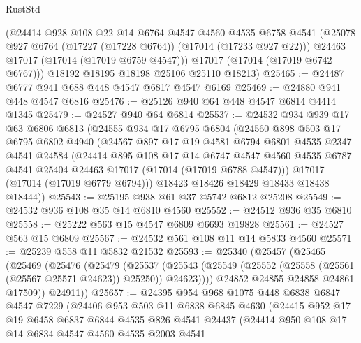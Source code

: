 \begin{lexlean}{RustStd}
\begin{coremodule}
        (@24414
          @928
          @108
          @22
          @14
          @6764
          @4547
          @4560
          @4535
          @6758
          @4541
          (@25078 @927 @6764 (@17227 (@17228 @6764)) (@17014 (@17233 @927 @22)))
          @24463
          @17017
          (@17014 (@17019 @6759 @4547)))
        @17017
        (@17014 (@17019 @6742 @6767)))
      @18192
      @18195
      @18198
      @25106
      @25110
      @18213)
@25465 := @24487 @6777 @941 @688 @448 @4547 @6817 @4547 @6169
@25469 := @24880 @941 @448 @4547 @6816
@25476 := @25126 @940 @64 @448 @4547 @6814 @4414 @1345
@25479 := @24527 @940 @64 @6814
@25537 := @24532
    @934
    @939
    @17
    @63
    @6806
    @6813
    (@24555
      @934
      @17
      @6795
      @6804
      (@24560
        @898
        @503
        @17
        @6795
        @6802
        @4940
        (@24567
          @897
          @17
          @19
          @4581
          @6794
          @6801
          @4535
          @2347
          @4541
          @24584
          (@24414
            @895
            @108
            @17
            @14
            @6747
            @4547
            @4560
            @4535
            @6787
            @4541
            @25404
            @24463
            @17017
            (@17014 (@17019 @6788 @4547)))
          @17017
          (@17014 (@17019 @6779 @6794)))
        @18423
        @18426
        @18429
        @18433
        @18438
        @18444))
@25543 := @25195 @938 @61 @37 @5742 @6812 @25208
@25549 := @24532 @936 @108 @35 @14 @6810 @4560
@25552 := @24512 @936 @35 @6810
@25558 := @25222 @563 @15 @4547 @6809 @6693 @19828
@25561 := @24527 @563 @15 @6809
@25567 := @24532 @561 @108 @11 @14 @5833 @4560
@25571 := @25239 @558 @11 @5832 @21532
@25593 := @25340
    (@25457
      (@25465
        (@25469
          (@25476
            (@25479
              (@25537
                (@25543 (@25549 (@25552 (@25558 (@25561 (@25567 @25571 @24623)) @25250)) @24623))))
            @24852
            @24855
            @24858
            @24861
            @17509))
        @24911))
@25657 := @24395
    @954
    @968
    @1075
    @448
    @6838
    @6847
    @4547
    @7229
    (@24406
      @953
      @503
      @11
      @6838
      @6845
      @4630
      (@24415
        @952
        @17
        @19
        @6458
        @6837
        @6844
        @4535
        @826
        @4541
        @24437
        (@24414
          @950
          @108
          @17
          @14
          @6834
          @4547
          @4560
          @4535
          @2003
          @4541

\end{coremodule}
\end{lexlean}
